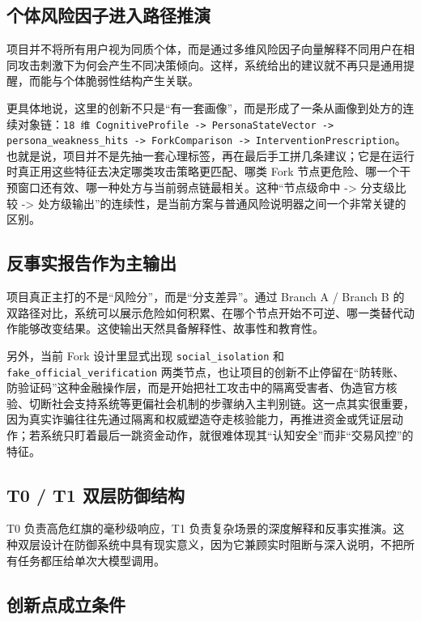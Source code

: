 \documentclass[12pt,a4paper]{ctexart}
\begin{document}
\subsection{个体风险因子进入路径推演}

项目并不将所有用户视为同质个体，而是通过多维风险因子向量解释不同用户在相同攻击刺激下为何会产生不同决策倾向。这样，系统给出的建议就不再只是通用提醒，而能与个体脆弱性结构产生关联。

更具体地说，这里的创新不只是“有一套画像”，而是形成了一条从画像到处方的连续对象链：\texttt{18 维 CognitiveProfile -> PersonaStateVector -> persona\_weakness\_hits -> ForkComparison -> InterventionPrescription}。也就是说，项目并不是先抽一套心理标签，再在最后手工拼几条建议；它是在运行时真正用这些特征去决定哪类攻击策略更匹配、哪类 Fork 节点更危险、哪一个干预窗口还有效、哪一种处方与当前弱点链最相关。这种“节点级命中 -> 分支级比较 -> 处方级输出”的连续性，是当前方案与普通风险说明器之间一个非常关键的区别。

\subsection{反事实报告作为主输出}

项目真正主打的不是“风险分”，而是“分支差异”。通过 Branch A / Branch B 的双路径对比，系统可以展示危险如何积累、在哪个节点开始不可逆、哪一类替代动作能够改变结果。这使输出天然具备解释性、故事性和教育性。

另外，当前 Fork 设计里显式出现 \texttt{social\_isolation} 和 \texttt{fake\_official\_verification} 两类节点，也让项目的创新不止停留在“防转账、防验证码”这种金融操作层，而是开始把社工攻击中的隔离受害者、伪造官方核验、切断社会支持系统等更偏社会机制的步骤纳入主判别链。这一点其实很重要，因为真实诈骗往往先通过隔离和权威塑造夺走核验能力，再推进资金或凭证层动作；若系统只盯着最后一跳资金动作，就很难体现其“认知安全”而非“交易风控”的特征。

\subsection{T0 / T1 双层防御结构}

T0 负责高危红旗的毫秒级响应，T1 负责复杂场景的深度解释和反事实推演。这种双层设计在防御系统中具有现实意义，因为它兼顾实时阻断与深入说明，不把所有任务都压给单次大模型调用。

\subsection{创新点成立条件}
\end{document}
